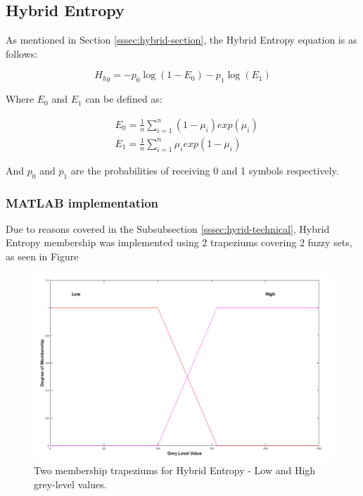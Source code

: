 \subsection{Hybrid Entropy}
\label{ssec:hybrid-sec}

As mentioned in Section \ref{sssec:hybrid-section}, the Hybrid Entropy equation is as follows:

\begin{equation}
  H_{hy} = -p_0\log(1 - E_0) - p_1\log(E_1)
\end{equation}

Where $E_0$ and $E_1$ can be defined as:

\begin{subequations} \label{eq:E0-E1}
  \begin{align}
    &E_0 = \frac{1}{n}\displaystyle\sum_{i=1}^{n}{(1-\mu_i)exp(\mu_i)} \\
    &E_1 = \frac{1}{n}\displaystyle\sum_{i=1}^{n}{\mu_iexp(1-\mu_i)}
  \end{align}
\end{subequations}

And $p_0$ and $p_1$ are the probabilities of receiving 0 and 1 symbols respectively.

\subsubsection{MATLAB implementation}

Due to reasons covered in the Subsubsection \ref{sssec:hyrid-technical}, Hybrid Entropy membership was implemented using 2 trapeziums covering 2 fuzzy sets, as seen in Figure

\begin{figure}[H]
  \center
  \includegraphics[scale=0.5]{Chapter2/hybrid-img/2_traps.png}
  \caption{Two membership trapeziums for Hybrid Entropy - Low and High grey-level values.}
  \label{fig:2-traps}
\end{figure}

